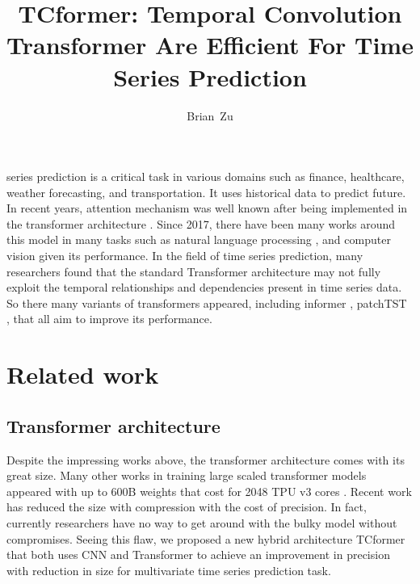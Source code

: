 \documentclass[10pt,journal,compsoc]{IEEEtran}
\begin{document}
\title{TCformer: Temporal Convolution Transformer Are Efficient For Time Series Prediction}

\author{Brian~Zu}

\maketitle


 series prediction is a critical task in various domains such as finance, healthcare, weather forecasting, and transportation. It uses historical data to predict future. In recent years, attention mechanism was well known after being implemented in the transformer architecture \cite{attention-is-all-you-need}. Since 2017, there have been many works around this model in many tasks such as natural language processing \cite{few-shot-learners}, and computer vision \cite{vit} given its performance.  In the field of time series prediction, many researchers found that the standard Transformer architecture may not fully exploit the temporal relationships and dependencies present in time series data. So there many variants of transformers appeared, including informer \cite{informer}, patchTST \cite{patchtst}, that all aim to improve its performance. 


\section{Related work}

\subsection{Transformer architecture}

Despite the impressing works above, the transformer architecture comes with its great size. Many other works in training large scaled transformer models appeared with up to 600B weights that cost for 2048 TPU v3 cores \cite{Lepikhin2020-jx}. Recent work \cite{pmlr-v119-li20m} has reduced the size with compression with the cost of precision. In fact, currently researchers have no way to get around with the bulky model without compromises. Seeing this flaw, we proposed a new hybrid architecture TCformer that both uses CNN and Transformer to achieve an improvement in precision with reduction in size for multivariate time series prediction task. 
\end{document}
